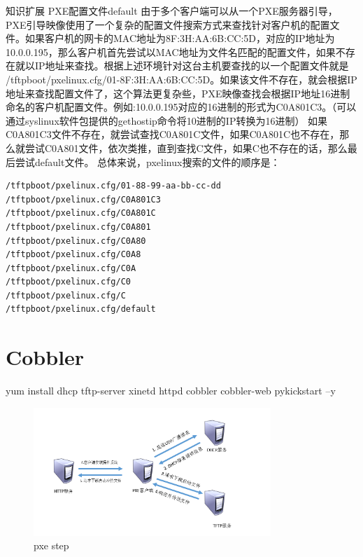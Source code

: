 知识扩展
PXE配置文件default
由于多个客户端可以从一个PXE服务器引导，PXE引导映像使用了一个复杂的配置文件搜索方式来查找针对客户机的配置文件。如果客户机的网卡的MAC地址为8F:3H:AA:6B:CC:5D，对应的IP地址为10.0.0.195，那么客户机首先尝试以MAC地址为文件名匹配的配置文件，如果不存在就以IP地址来查找。根据上述环境针对这台主机要查找的以一个配置文件就是 /tftpboot/pxelinux.cfg/01-8F:3H:AA:6B:CC:5D。如果该文件不存在，就会根据IP地址来查找配置文件了，这个算法更复杂些，PXE映像查找会根据IP地址16进制命名的客户机配置文件。例如:10.0.0.195对应的16进制的形式为C0A801C3。（可以通过syslinux软件包提供的gethostip命令将10进制的IP转换为16进制）
如果C0A801C3文件不存在，就尝试查找C0A801C文件，如果C0A801C也不存在，那么就尝试C0A801文件，依次类推，直到查找C文件，如果C也不存在的话，那么最后尝试default文件。
总体来说，pxelinux搜索的文件的顺序是：

\begin{lstlisting}
/tftpboot/pxelinux.cfg/01-88-99-aa-bb-cc-dd
/tftpboot/pxelinux.cfg/C0A801C3
/tftpboot/pxelinux.cfg/C0A801C
/tftpboot/pxelinux.cfg/C0A801
/tftpboot/pxelinux.cfg/C0A80
/tftpboot/pxelinux.cfg/C0A8
/tftpboot/pxelinux.cfg/C0A
/tftpboot/pxelinux.cfg/C0
/tftpboot/pxelinux.cfg/C
/tftpboot/pxelinux.cfg/default
\end{lstlisting}


\section{Cobbler}

yum install dhcp tftp-server xinetd httpd cobbler cobbler-web pykickstart –y

\begin{figure}[!ht]
    \centering
     \caption{\label{Fig:pxe-step} pxe step}
    \includegraphics[width=0.8\textwidth]{./cobble/images/pxe-step.png}
\end{figure}

